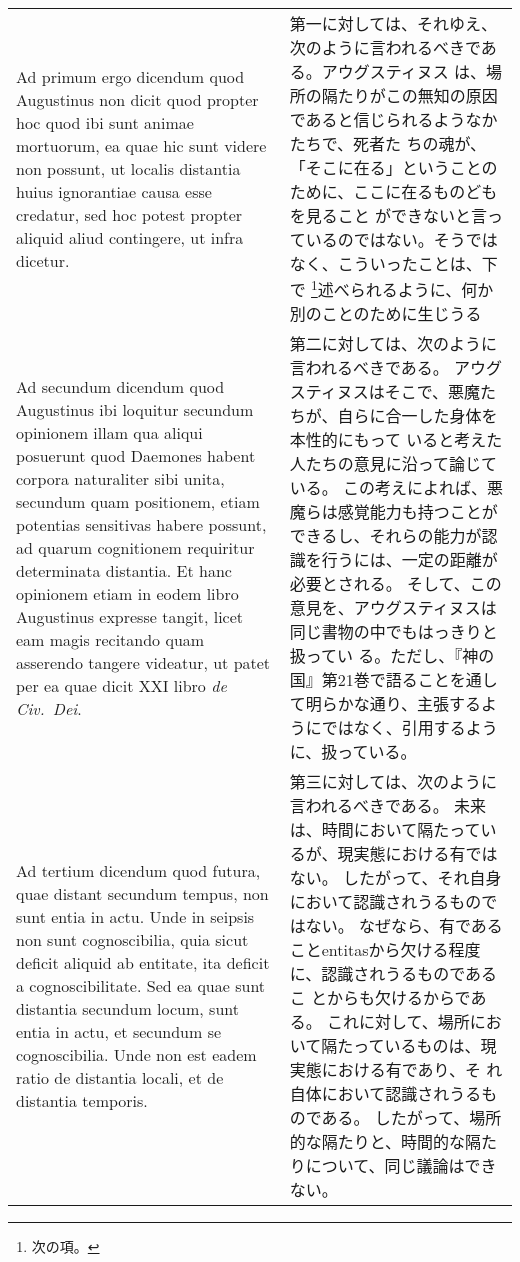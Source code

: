 \documentclass[10pt]{jsarticle} %
\begin{document}
\begin{longtable}{p{21em}p{21em}}
\\


{\sc Ad primum ergo dicendum} quod Augustinus non
 dicit quod propter hoc quod ibi sunt animae mortuorum, ea quae hic sunt
 videre non possunt, ut localis distantia huius ignorantiae causa esse
 credatur, sed hoc potest propter aliquid aliud contingere, ut infra
 dicetur.


&

第一に対しては、それゆえ、次のように言われるべきである。アウグスティヌス
は、場所の隔たりがこの無知の原因であると信じられるようなかたちで、死者た
ちの魂が、「そこに在る」ということのために、ここに在るものどもを見ること
ができないと言っているのではない。そうではなく、こういったことは、下で
\footnote{次の項。}述べられるように、何か別のことのために生じうる

\\



{\sc Ad secundum dicendum} quod Augustinus ibi
 loquitur secundum opinionem illam qua aliqui posuerunt quod Daemones
 habent corpora naturaliter sibi unita, secundum quam positionem, etiam
 potentias sensitivas habere possunt, ad quarum cognitionem requiritur
 determinata distantia. Et hanc opinionem etiam in eodem libro
 Augustinus expresse tangit, licet eam magis recitando quam asserendo
 tangere videatur, ut patet per ea quae dicit XXI libro {\it de Civ.~Dei}.

&
第二に対しては、次のように言われるべきである。
アウグスティヌスはそこで、悪魔たちが、自らに合一した身体を本性的にもって
 いると考えた人たちの意見に沿って論じている。
この考えによれば、悪魔らは感覚能力も持つことができるし、それらの能力が認
 識を行うには、一定の距離が必要とされる。
そして、この意見を、アウグスティヌスは同じ書物の中でもはっきりと扱ってい
 る。ただし、『神の国』第21巻で語ることを通して明らかな通り、主張するよ
 うにではなく、引用するように、扱っている。


\\


{\sc Ad tertium dicendum} quod futura, quae
 distant secundum tempus, non sunt entia in actu. Unde in seipsis non
 sunt cognoscibilia, quia sicut deficit aliquid ab entitate, ita deficit
 a cognoscibilitate. Sed ea quae sunt distantia secundum locum, sunt
 entia in actu, et secundum se cognoscibilia. Unde non est eadem ratio
 de distantia locali, et de distantia temporis.


&

第三に対しては、次のように言われるべきである。
未来は、時間において隔たっているが、現実態における有ではない。
したがって、それ自身において認識されうるものではない。
なぜなら、有であることentitasから欠ける程度に、認識されうるものであるこ
 とからも欠けるからである。
これに対して、場所において隔たっているものは、現実態における有であり、そ
 れ自体において認識されうるものである。
したがって、場所的な隔たりと、時間的な隔たりについて、同じ議論はできない。



\end{longtable}
\end{document}
